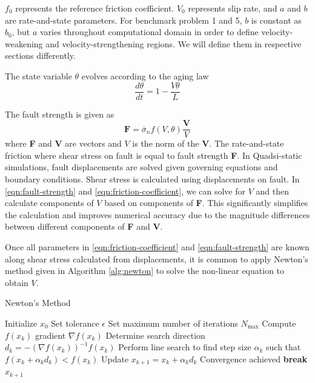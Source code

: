 $f_0$ represents the reference friction coefficient. $V_0$ represents slip rate, and $a$ and $b$ are rate-and-state parameters. For benchmark problem 1 and 5, $b$ is constant as $b_0$, but $a$ varies throughout computational domain  in order to define velocity-weakening and velocity-strengthening regions. We will define them in respective sections differently.

The state variable $\theta$ evolves according to the aging law
\begin{equation}
    \frac{d\theta}{dt} = 1 - \frac{V\theta}{L}
    \label{eqn:aging-law}
\end{equation}

The fault strength is given as 
\begin{equation}
    \textbf{F} = \bar{\sigma}_n f(V,\theta) \frac{\textbf{V}}{V}
    \label{eqn:fault-strength}
\end{equation}
where \textbf{F} and \textbf{V} are vectors and $V$ is the norm of the \textbf{V}.
The rate-and-state friction where shear stress on fault is equal to fault strength \textbf{F}.
In Quadsi-static simulations, fault displacements are solved given governing equations and boundary conditions. 
Shear stress is calculated using displacements on fault.
In \autoref{eqn:fault-strength} and \autoref{eqn:friction-coefficient}, we can solve for $V$ and then calculate components of $V$ based on components of \textbf{F}. 
This significantly simplifies the calculation and improves numerical accuracy due to the magnitude differences between different components of \textbf{F} and \textbf{V}.

Once all parameters in \autoref{eqn:friction-coefficient} and \autoref{eqn:fault-strength} are known along shear stress calculated from displacements, it is common to apply Newton's method given in Algorithm \autoref{alg:newton} to solve the non-linear equation to obtain $V$.
\begin{algorithm}
\caption{Newton's Method}
\begin{algorithmic}[1]
\State Initialize $x_0$
\State Set tolerance $\epsilon$
\State Set maximum number of iterations $N_{\max}$
    \State Compute $f(x_k)$ gradient $\nabla f(x_k)$
    \State Determine search direction $d_k = -(\nabla f(x_k))^{-1}f(x_k)$
    \State Perform line search to find step size $\alpha_k$ such that $f(x_k + \alpha_k d_k) < f(x_k)$
    \State Update $x_{k+1} = x_k + \alpha_k d_k$
        \State Convergence achieved
        \State \textbf{break}
    \EndIf
\EndFor
\Return $x_{k+1}$
\end{algorithmic}
\label{alg:newton}
\end{algorithm}

